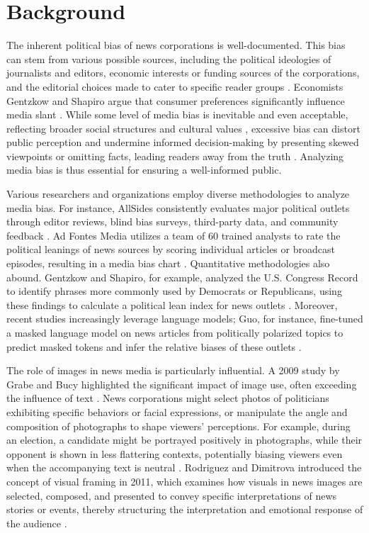 \documentclass[sigconf]{acmart}
\begin{document}
\vspace{-7pt}

\section{Background}\label{sec:background}

The inherent political bias of news corporations is well-documented. This bias can stem from various possible sources, including the political ideologies of journalists and editors, economic interests or funding sources of the corporations, and the editorial choices made to cater to specific reader groups \cite{theorymediabias}. Economists Gentzkow and Shapiro argue that consumer preferences significantly influence media slant \cite{WhatDrivesMediaSlant}. While some level of media bias is inevitable and even acceptable, reflecting broader social structures and cultural values \cite{historyUSNews}, excessive bias can distort public perception and undermine informed decision-making by presenting skewed viewpoints or omitting facts, leading readers away from the truth \cite{theorymediabias}. Analyzing media bias is thus essential for ensuring a well-informed public.

Various researchers and organizations employ diverse methodologies to analyze media bias. For instance, AllSides consistently evaluates major political outlets through editor reviews, blind bias surveys, third-party data, and community feedback \cite{allsidesbias2024}. Ad Fontes Media utilizes a team of 60 trained analysts to rate the political leanings of news sources by scoring individual articles or broadcast episodes, resulting in a media bias chart \cite{adfont}. Quantitative methodologies also abound. Gentzkow and Shapiro, for example, analyzed the U.S. Congress Record to identify phrases more commonly used by Democrats or Republicans, using these findings to calculate a political lean index for news outlets \cite{WhatDrivesMediaSlant}. Moreover, recent studies increasingly leverage language models; Guo, for instance, fine-tuned a masked language model on news articles from politically polarized topics to predict masked tokens and infer the relative biases of these outlets \cite{MLM}.

The role of images in news media is particularly influential. A 2009 study by Grabe and Bucy highlighted the significant impact of image use, often exceeding the influence of text \cite{imagebite}. News corporations might select photos of politicians exhibiting specific behaviors or facial expressions, or manipulate the angle and composition of photographs to shape viewers' perceptions. For example, during an election, a candidate might be portrayed positively in photographs, while their opponent is shown in less flattering contexts, potentially biasing viewers even when the accompanying text is neutral \cite{imagebite}. Rodriguez and Dimitrova introduced the concept of visual framing in 2011, which examines how visuals in news images are selected, composed, and presented to convey specific interpretations of news stories or events, thereby structuring the interpretation and emotional response of the audience \cite{visualframing}.
\end{document}
